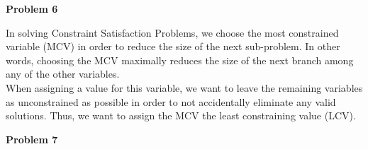 \documentclass[11pt]{article}
\begin{document}
    \begin{center}
        \Large
        \textbf{Problem 6}
    \end{center}
    \normalsize
    In solving Constraint Satisfaction Problems, we choose the most constrained variable (MCV)
    in order to reduce the size of the next sub-problem.
    In other words, choosing the MCV maximally reduces the size of the next branch among
    any of the other variables. \\
    When assigning a value for this variable, we want to leave the remaining variables as unconstrained
    as possible in order to not accidentally eliminate any valid solutions.
    Thus, we want to assign the MCV the least constraining value (LCV).

    \begin{center}
        \Large
        \textbf{Problem 7}
    \end{center}
    \normalsize
\end{document}
